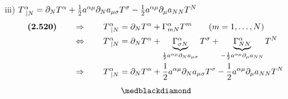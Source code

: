 iii) $T^{\alpha}_{\ |N} = \partial_{N}T^{\alpha}  + \frac{1}{2} a^{\alpha\mu} \partial_N a_{\mu\sigma}T^{\sigma} - \frac{1}{2} a^{\alpha\mu}  \partial_{\mu} a_{NN}T^{N}$\\
\begin{align}
\textbf{(2.520)}\quad\quad \Rightarrow \quad\quad T^{\alpha}_{\ |N} &= \partial_{N}T^{\alpha}+\Gamma^{\alpha}_{mN}T^m \quad\quad\text{(}m = 1,\dots,N \text{)}\\
\Leftrightarrow \quad\quad T^{\alpha}_{\ |N} &=  \partial_{N}T^{\alpha}+ \underbrace{\Gamma^{\alpha}_{\sigma N }}_{ \frac{1}{2} a^{\alpha \mu}\partial_N a_{\mu\sigma}}  T^{\sigma }+\underbrace{\Gamma^{\alpha}_{N N}}_{ -\frac{1}{2} a^{\alpha\mu}\partial_{\mu} a_{NN}}T^{N}\\
\Rightarrow \quad\quad T^{\alpha}_{\ |N} &=  \partial_{N}T^{\alpha}+ \frac{1}{2} a^{\alpha \mu}\partial_N a_{\mu\sigma}T^{\sigma } -\frac{1}{2} a^{\alpha\mu}\partial_{\mu} a_{NN}T^{N}
\end{align}
$$\medblackdiamond$$
\newpage

